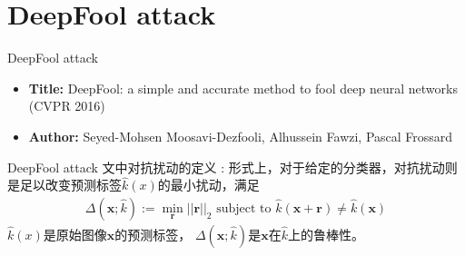 \section{DeepFool attack}

\begin{frame}{DeepFool attack}
    \begin{itemize}
        \item \textbf{Title:} DeepFool: a simple and accurate method to fool deep neural networks (CVPR 2016)
        \item \textbf{Author:} Seyed-Mohsen Moosavi-Dezfooli, Alhussein Fawzi, Pascal Frossard
    \end{itemize}
\end{frame}

\begin{frame}{DeepFool attack}
    文中对抗扰动的定义 : 形式上，对于给定的分类器，对抗扰动则是足以改变预测标签$\hat{k}(x)$的最小扰动，满足
    \begin{equation}
        \begin{aligned}
            \Delta(\boldsymbol{x};\hat{k})
            :=\mathop{\min}\limits_{\boldsymbol{r}}||\boldsymbol{r}||_2  
            \text{ subject to } 
            \hat{k}(\boldsymbol{x}+\boldsymbol{r})\neq \hat{k}(\boldsymbol{x})
          \end{aligned}
    \end{equation}
    $\hat{k}(x)$是原始图像$\boldsymbol{x}$的预测标签， $\Delta(\boldsymbol{x};\hat{k})$是$\boldsymbol{x}$在$\hat{k}$上的鲁棒性。
\end{frame}

